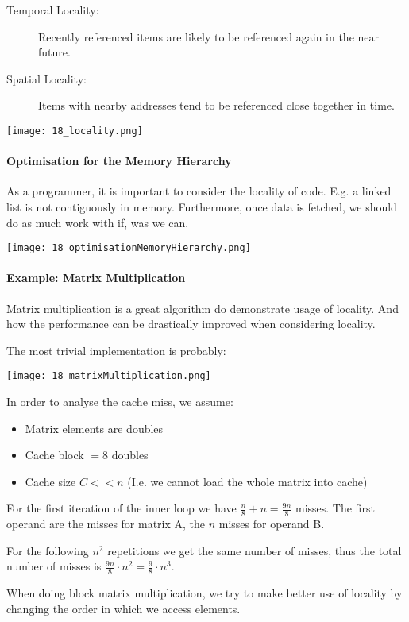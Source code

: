 \begin{description}
    \item[Temporal Locality:] Recently referenced items are likely to be referenced again in the near future.
    \item[Spatial Locality:] Items with nearby addresses tend to be referenced close together in time.
\end{description}

\texttt{[image: 18\_locality.png]}

\paragraph{Optimisation for the Memory Hierarchy}
As a programmer, it is important to consider the locality of code. E.g. a linked list is not contiguously in memory. Furthermore, once data is fetched, we should do as much work with if, was we can.

\texttt{[image: 18\_optimisationMemoryHierarchy.png]}

\paragraph{Example: Matrix Multiplication}
Matrix multiplication is a great algorithm do demonstrate usage of locality. And how the performance can be drastically improved when considering locality.

The most trivial implementation is probably:

\texttt{[image: 18\_matrixMultiplication.png]}

In order to analyse the cache miss, we assume:
\begin{itemize}
    \item Matrix elements are doubles
    \item Cache block $= 8$ doubles
    \item Cache size $C << n$ (I.e. we cannot load the whole matrix into cache)
\end{itemize}

For the first iteration of the inner loop we have $\frac{n}{8} + n = \frac{9n}{8}$ misses. The first operand are the misses for matrix A, the $n$ misses for operand B.

For the following $n^2$ repetitions we get the same number of misses, thus the total number of misses is $\frac{9n}{8} \cdot n^2 = \frac{9}{8} \cdot n^3$.

When doing block matrix multiplication, we try to make better use of locality by changing the order in which we access elements.

